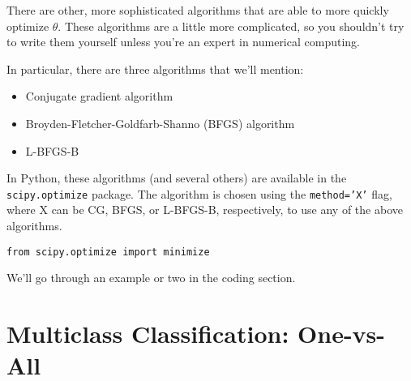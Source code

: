 There are other, more sophisticated algorithms that are able to more quickly optimize $\theta$. These algorithms are a little more complicated, so you shouldn't try to write them yourself unless you're an expert in numerical computing. 

In particular, there are three algorithms that we'll mention:
\begin{itemize}
\item Conjugate gradient algorithm
\item Broyden-Fletcher-Goldfarb-Shanno (BFGS) algorithm
\item L-BFGS-B
\end{itemize}
In Python, these algorithms (and several others) are available in the {\tt scipy.optimize} package. The algorithm is chosen using the {\tt method='X'} flag, where X can be CG, BFGS, or L-BFGS-B, respectively, to use any of the above algorithms. 
\begin{verbatim}
from scipy.optimize import minimize
\end{verbatim}
We'll go through an example or two in the coding section.



\section{Multiclass Classification: One-vs-All}

